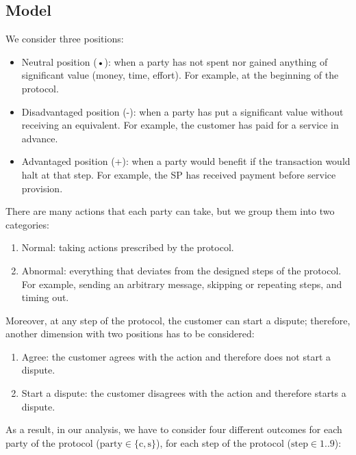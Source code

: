 \documentclass[pdftex,twocolumn,epjc3]{svjour3}
\begin{document}
{\subsection{Model}\label{sec:fairness-model}
We consider three positions:

\begin{itemize}
\item Neutral position (•): when a party has not spent nor gained anything of significant value (money, time, effort). For example, at the beginning of the protocol.
\item Disadvantaged position (-): when a party has put a significant value without receiving an equivalent. For example, the customer has paid for a service in advance.
\item Advantaged position (+): when a party would benefit if the transaction would halt at that step. For example, the SP has received payment before service provision.
\end{itemize}

There are many actions that each party can take, but we group them into two categories:

\begin{enumerate}
\def\labelenumi{\arabic{enumi}.}

\item Normal: taking actions prescribed by the protocol.
\item Abnormal: everything that deviates from the designed steps of the protocol. For example, sending an arbitrary message, skipping or repeating steps, and timing out.
\end{enumerate}

Moreover, at any step of the protocol, the customer can start a dispute; therefore, another dimension with two positions has to be considered:

\begin{enumerate}
\def\labelenumi{\arabic{enumi}.}

\item Agree: the customer agrees with the action and therefore does not start a dispute.
\item Start a dispute: the customer disagrees with the action and therefore starts a dispute.
\end{enumerate}

As a result, in our analysis, we have to consider four different outcomes for each party of the protocol ($\mathrm{party \in \{c, s}\}$), for each step of the protocol ($\mathrm{step \in 1..9}$):

}
\end{document}
